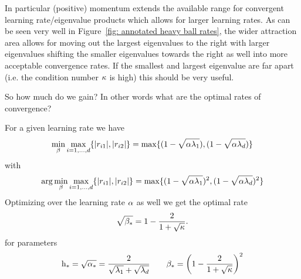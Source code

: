 In particular (positive) momentum extends the available range for convergent
learning rate/eigenvalue products which allows for larger learning rates. As
can be seen very well in Figure~\ref{fig: annotated heavy ball rates}, the
wider attraction area allows for moving out the largest eigenvalues to the
right with larger eigenvalues shifting the smaller eigenvalues towards the
right as well into more acceptable convergence rates. If the smallest and
largest eigenvalue are far apart (i.e. the condition number \(\kappa\) is
high) this should be very useful.

So how much do we gain? In other words what are the optimal rates of
convergence? 

\begin{lemma}
	\label{lem: optimal hb parameter selection}
	For a given learning rate we have
	\begin{align*}
		\min_{\beta}\max_{i=1,\dots, d}\{|r_{i1}|,|r_{i2}|\}
		= \max\{(1-\sqrt{\alpha\lambda_1}), (1-\sqrt{\alpha\lambda_d})\}
	\end{align*}
	with 
	\begin{align*}
		\arg\min_{\beta}\max_{i=1,\dots,d}\{|r_{i1}|,|r_{i2}|\}
		= \max\{(1-\sqrt{\alpha\lambda_1})^2, (1-\sqrt{\alpha\lambda_d})^2\}
	\end{align*}
	Optimizing over the learning rate \(\alpha\) as well we get the optimal rate
	\begin{align*}
		\sqrt{\beta_*} = 1-\frac{2}{1+\sqrt{\kappa}}.
	\end{align*}
	for parameters
	\begin{align*}
		\text{h}_* = \sqrt{\alpha_*} = \frac{2}{\sqrt{\lambda_1}+\sqrt{\lambda_d}}
		\qquad
		\beta_*=\left(1-\frac{2}{1+\sqrt{\kappa}}\right)^2
	\end{align*}
\end{lemma}

